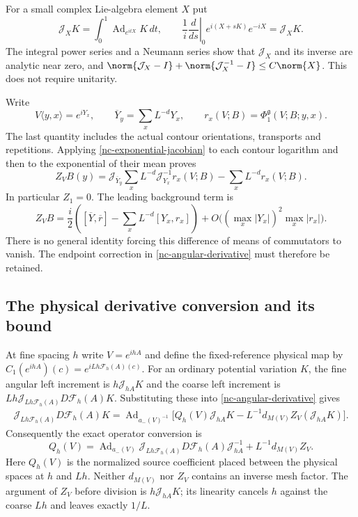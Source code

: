 For a small complex Lie-algebra element $X$ put
\begin{equation}
 \mathcal J_XK=\int_0^1\operatorname{Ad}_{e^{itX}}K\,dt,
 \qquad
 \frac1i\left.\frac d{ds}\right|_0e^{i(X+sK)}e^{-iX}
           =\mathcal J_XK.
 \label{nc-exponential-jacobian}
\end{equation}
The integral power series and a Neumann series show that
$\mathcal J_X$ and its inverse are analytic near zero, and
$\norm{\mathcal J_X-I}+\norm{\mathcal J_X^{-1}-I}\le C\norm{X}$.
This does not require unitarity.

Write
\[
 V\langle y,x\rangle=e^{iY_x},\qquad
 \overline Y_y=\sum_xL^{-d}Y_x,\qquad
 r_x(V;B)=\Phi_1^{\mathfrak g}(V;B;y,x).
\]
The last quantity includes the actual contour orientations,
transports and repetitions. Applying
\eqref{nc-exponential-jacobian} to each contour logarithm and then
to the exponential of their mean proves
\begin{equation}
 Z_VB(y)=\mathcal J_{\overline Y_y}
       \sum_xL^{-d}\mathcal J_{Y_x}^{-1}r_x(V;B)
          -\sum_xL^{-d}r_x(V;B).
 \label{nc-Z-formula}
\end{equation}
In particular $Z_1=0$. The leading background term is
\[
 Z_VB=\frac i2\left(
   [\overline Y,\overline r]-\sum_xL^{-d}[Y_x,r_x]\right)
   +O\bigl((\max_x|Y_x|)^2\max_x|r_x|\bigr).
\]
There is no general identity forcing this difference of means of
commutators to vanish. The endpoint correction in
\eqref{nc-angular-derivative} must therefore be retained.

\subsection{The physical derivative conversion and its bound}
\label{nc-physical}

At fine spacing $h$ write $V=e^{ihA}$ and define the fixed-reference
physical map by
$C_1(e^{ihA})(c)=e^{iLh\mathcal F_h(A)(c)}$. For an ordinary
potential variation $K$, the fine angular left increment is
$h\mathcal J_{hA}K$ and the coarse left increment is
$Lh\mathcal J_{Lh\mathcal F_h(A)}D\mathcal F_h(A)K$.
Substituting these into \eqref{nc-angular-derivative} gives
\begin{equation}
 \begin{split}
 \mathcal J_{Lh\mathcal F_h(A)}D\mathcal F_h(A)K
 =\operatorname{Ad}_{a_-(V)^{-1}}\bigl[
 Q_h(V)\mathcal J_{hA}K
  -L^{-1}d_{M(V)}Z_V(\mathcal J_{hA}K)\bigr].
 \end{split}
 \label{nc-physical-unrearranged}
\end{equation}
Consequently the exact operator conversion is
\begin{equation}
 \boxed{\displaystyle
 Q_h(V)=\operatorname{Ad}_{a_-(V)}
   \mathcal J_{Lh\mathcal F_h(A)}D\mathcal F_h(A)
        \mathcal J_{hA}^{-1}+L^{-1}d_{M(V)}Z_V.}
 \label{nc-physical-conversion}
\end{equation}
Here $Q_h(V)$ is the normalized source coefficient placed between
the physical spaces at $h$ and $Lh$. Neither $d_{M(V)}$ nor $Z_V$
contains an inverse mesh factor. The argument of $Z_V$ before
division is $h\mathcal J_{hA}K$; its linearity cancels $h$ against
the coarse $Lh$ and leaves exactly $1/L$.

